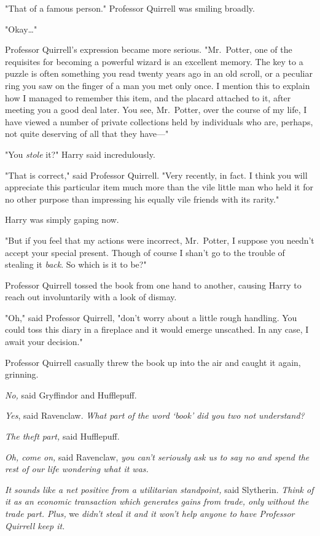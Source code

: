 "That of a famous person." Professor Quirrell was smiling broadly.

"Okay{\ldots}"

Professor Quirrell's expression became more serious. "Mr.~Potter, one of the 
requisites for becoming a powerful wizard is an excellent memory. The key to a 
puzzle is often something you read twenty years ago in an old scroll, or a 
peculiar ring you saw on the finger of a man you met only once. I mention this 
to explain how I managed to remember this item, and the placard attached to it, 
after meeting you a good deal later. You see, Mr.~Potter, over the course of my 
life, I have viewed a number of private collections held by individuals who 
are, perhaps, not quite deserving of all that they have---"

"You \emph{stole} it?" Harry said incredulously.

"That is correct," said Professor Quirrell. "Very recently, in fact. I think 
you will appreciate this particular item much more than the vile little man who 
held it for no other purpose than impressing his equally vile friends with its 
rarity."

Harry was simply gaping now.

"But if you feel that my actions were incorrect, Mr.~Potter, I suppose you 
needn't accept your special present. Though of course I shan't go to the 
trouble of stealing it \emph{back}. So which is it to be?"

Professor Quirrell tossed the book from one hand to another, causing Harry to 
reach out involuntarily with a look of dismay.

"Oh," said Professor Quirrell, "don't worry about a little rough handling. You 
could toss this diary in a fireplace and it would emerge unscathed. In any 
case, I await your decision."

Professor Quirrell casually threw the book up into the air and caught it again, 
grinning.

\emph{No,} said Gryffindor and Hufflepuff.

\emph{Yes}, said Ravenclaw. \emph{What part of the word `book' did you two not 
understand?}

\emph{The theft part,} said Hufflepuff.

\emph{Oh, come on,} said Ravenclaw, \emph{you can't seriously ask us to say no 
and spend the rest of our life wondering what it was.}

\emph{It sounds like a net positive from a utilitarian standpoint,} said 
Slytherin. \emph{Think of it as an economic transaction which generates gains 
from trade, only without the trade part. Plus,} we \emph{didn't steal it and it 
won't help anyone to have Professor Quirrell keep it.}

